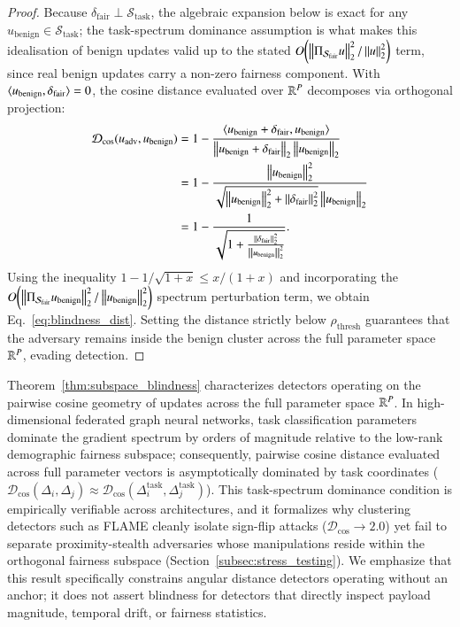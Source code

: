 \begin{proof}
Because $\delta_{\mathrm{fair}} \perp \mathcal{S}_{\mathrm{task}}$, the algebraic expansion below is exact for any $u_{\mathrm{benign}} \in \mathcal{S}_{\mathrm{task}}$; the task-spectrum dominance assumption is what makes this idealisation of benign updates valid up to the stated $O\!\left(\left\lVert \Pi_{\mathcal{S}_{\mathrm{fair}}} u \right\rVert_2^2 / \left\lVert u \right\rVert_2^2\right)$ term, since real benign updates carry a non-zero fairness component. With $\langle u_{\mathrm{benign}}, \delta_{\mathrm{fair}} \rangle = 0$, the cosine distance evaluated over $\mathbb{R}^P$ decomposes via orthogonal projection:
\begin{align*}
\mathcal{D}_{\mathrm{cos}}(u_{\mathrm{adv}}, u_{\mathrm{benign}}) &= 1 - \frac{\langle u_{\mathrm{benign}} + \delta_{\mathrm{fair}}, u_{\mathrm{benign}} \rangle}{\left\lVert u_{\mathrm{benign}} + \delta_{\mathrm{fair}} \right\rVert_2 \left\lVert u_{\mathrm{benign}} \right\rVert_2} \\
&= 1 - \frac{\left\lVert u_{\mathrm{benign}} \right\rVert_2^2}{\sqrt{\left\lVert u_{\mathrm{benign}} \right\rVert_2^2 + \left\lVert \delta_{\mathrm{fair}} \right\rVert_2^2} \left\lVert u_{\mathrm{benign}} \right\rVert_2} \\
&= 1 - \frac{1}{\sqrt{1 + \frac{\left\lVert \delta_{\mathrm{fair}} \right\rVert_2^2}{\left\lVert u_{\mathrm{benign}} \right\rVert_2^2}}}.
\end{align*}
Using the inequality $1 - 1/\sqrt{1+x} \le x / (1+x)$ and incorporating the $O\!\left( \left\lVert \Pi_{\mathcal{S}_{\mathrm{fair}}} u_{\mathrm{benign}} \right\rVert_2^2 / \left\lVert u_{\mathrm{benign}} \right\rVert_2^2 \right)$ spectrum perturbation term, we obtain Eq.~\eqref{eq:blindness_dist}. Setting the distance strictly below $\rho_{\mathrm{thresh}}$ guarantees that the adversary remains inside the benign cluster across the full parameter space $\mathbb{R}^P$, evading detection.
\end{proof}

\begin{remark}
\label{rem:subspace_blindness_scope}
Theorem~\ref{thm:subspace_blindness} characterizes detectors operating on the pairwise cosine geometry of updates across the full parameter space $\mathbb{R}^P$. In high-dimensional federated graph neural networks, task classification parameters dominate the gradient spectrum by orders of magnitude relative to the low-rank demographic fairness subspace; consequently, pairwise cosine distance evaluated across full parameter vectors is asymptotically dominated by task coordinates ($\mathcal{D}_{\mathrm{cos}}(\Delta_i, \Delta_j) \approx \mathcal{D}_{\mathrm{cos}}(\Delta_i^{\mathrm{task}}, \Delta_j^{\mathrm{task}})$). This task-spectrum dominance condition is empirically verifiable across architectures, and it formalizes why clustering detectors such as FLAME cleanly isolate sign-flip attacks ($\mathcal{D}_{\mathrm{cos}} \to 2.0$) yet fail to separate proximity-stealth adversaries whose manipulations reside within the orthogonal fairness subspace (Section~\ref{subsec:stress_testing}). We emphasize that this result specifically constrains angular distance detectors operating without an anchor; it does not assert blindness for detectors that directly inspect payload magnitude, temporal drift, or fairness statistics.
\end{remark}

